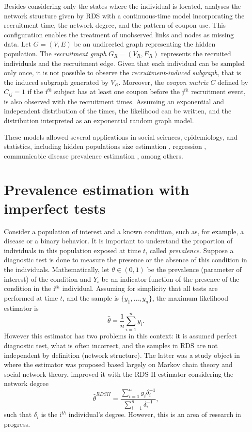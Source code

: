 Besides considering only the states where the individual is located,
\cite{crawford2016} analyses the network structure given by RDS with a
continuous-time model incorporating the recruitment time, the network degree,
and the pattern of coupon use. This configuration enables the treatment of
unobserved links and nodes as missing data. Let $G = (V,E)$ be an undirected
graph representing the hidden population. The {\em recruitment graph} $G_R =
(V_R, E_R)$ represents the recruited individuals and the recruitment edge.
Given that each individual can be sampled only once, it is not possible to
observe the {\em recruitment-induced subgraph}, that is the induced subgraph
generated by $V_R$. Moreover, the {\em coupon matrix} $C$ defined by $C_{ij} =
1$ if the i$^{th}$ subject has at least one coupon before the j$^{th}$
recruitment event, is also observed with the recruitment times. Assuming an
exponential and independent distribution of the times, the likelihood can be
written, and the distribution interpreted as an exponential random graph
model. 

These models allowed several applications in social sciences, epidemiology,
and statistics, including hidden populations size estimation
\cite{crawford2018hidden}, regression \cite{bastos2012binary}, communicable
disease prevalence estimation \cite{albuquerque2009avaliaccao}, among others. 

\section{Prevalence estimation with imperfect tests}

Consider a population of interest and a known condition, such as, for example,
a disease or a binary behavior. It is important to understand the proportion
of individuals in this population exposed at time $t$, called {\em
prevalence}. Suppose a diagnostic test is done to measure the presence or the
absence of this condition in the individuals. Mathematically, let $\theta \in
(0,1)$ be the prevalence (parameter of interest) of the condition and $Y_i$ be an indicator function of the presence of the condition in the i$^{th}$ individual.
Assuming for simplicity that all tests are performed at time $t$, and the
sample is $\{y_1, ..., y_n\}$, the maximum likelihood estimator is 
\begin{equation}
    \label{eq:naive-estimator}
    \hat{\theta} = \frac{1}{n}\sum_{i=1}^n y_i.
\end{equation}
However this estimator has two problems in this context: it is assumed perfect
diagnostic test, what is often incorrect, and the samples in RDS are not
independent by definition (network structure). The latter was a study object
in \cite{heckathorn1997,heckathorn2002} where the estimator was proposed
based largely on Markov chain theory and social network theory.
\cite{volz2008probability} improved it with the RDS II estimator considering
the network degree
\begin{equation}
    \hat{\theta}^{RDS II} = \frac{\sum_{i=1}^n y_i \delta_i^{-1}}{\sum_{i=1}^n \delta_i^{-1}},
\end{equation}
such that $\delta_i$ is the i$^{th}$ individual's degree. However, this is an
area of research in progress. 

